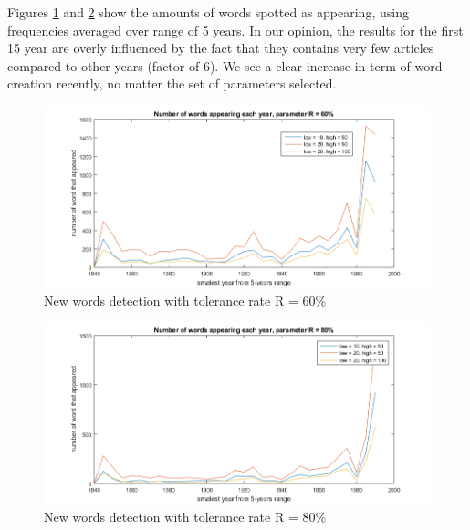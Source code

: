 Figures \ref{ratio60} and \ref{ratio80} show the amounts of words spotted as appearing, using frequencies averaged over range of 5 years.  In our opinion, the results for the first 15 year are overly influenced by the fact that they contains very few articles compared to other years (factor of 6). We see a clear increase in term of word creation recently, no matter the set of parameters selected. 
\begin{figure}[h!]
        \includegraphics[scale=0.65]{Pictures/statistics/appearing-words/word-appearing-ratio60.png}
        \caption{New words detection with tolerance rate R = 60\%}
        \label{ratio60}
	\centering
\end{figure}
\begin{figure}[h!]
        \includegraphics[scale=0.65]{Pictures/statistics/appearing-words/word-appearing-ratio80.png}
        \caption{New words detection with tolerance rate R = 80\%}
        \label{ratio80}
	\centering
\end{figure}
